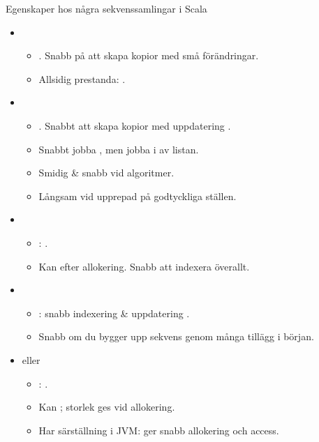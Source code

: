 \begin{Slide}{Egenskaper hos några sekvenssamlingar i Scala}
\vspace{-0.5em}
\begin{itemize}\SlideFontSmall

\item {}
  \begin{itemize}\SlideFontSmall
  \item {}. Snabb på att skapa kopior med små förändringar.
  \item Allsidig prestanda: .
  \end{itemize}

\item {}
  \begin{itemize}\SlideFontSmall
  \item {}. Snabbt att skapa kopior med uppdatering .
  \item Snabbt jobba , men  jobba i  av listan.
  \item Smidig \& snabb vid  algoritmer.
  \item Långsam vid upprepad  på godtyckliga ställen.
  \end{itemize}

\item {}
  \begin{itemize}\SlideFontSmall
  \item {}: .
  \item Kan  efter allokering. Snabb att indexera överallt.
  \end{itemize}

\item {}
  \begin{itemize}\SlideFontSmall
  \item {}: snabb indexering \& uppdatering .
  \item Snabb om du bygger upp sekvens genom många tillägg i början.
  \end{itemize}

\item {} eller 
  \begin{itemize}\SlideFontSmall
  \item {}: .
  \item Kan ; storlek ges vid allokering.
  \item Har särställning i JVM: ger snabb allokering och access.
  \end{itemize}

\end{itemize}
\end{Slide}

